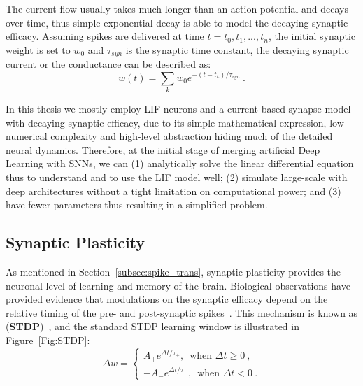 The current flow usually takes much longer than an action potential and decays over time, thus \DIFdelbegin {}\DIFdelend \DIFaddbegin {}\DIFaddend simple exponential decay is able to model the decaying synaptic efficacy.
Assuming spikes are delivered at time $t={t_0, t_1, ..., t_n}$, the initial synaptic weight is set to $w_0$ and $\tau_{syn}$ is the synaptic time constant, the decaying synaptic current or the conductance can be described as:
\begin{equation}
w(t) = \sum_k w_0 e^{-(t-t_k)/\tau_{syn}}~.
\end{equation}

In this thesis we mostly employ LIF neurons and a current-based synapse model with decaying synaptic efficacy, due to its simple mathematical expression, low numerical complexity and high-level abstraction hiding much of the detailed neural dynamics.
Therefore, at the initial stage of merging artificial Deep Learning with \DIFdelbegin {}\DIFdelend \DIFaddbegin {}\DIFaddend SNNs, we can (1) analytically solve the linear differential equation thus to understand and to use the LIF model well; (2) simulate large-scale \DIFdelbegin {}\DIFdelend \DIFaddbegin {}\DIFaddend with deep architectures without a tight limitation on computational power; and (3) have fewer parameters thus resulting in a simplified problem.


\subsection{Synaptic Plasticity}
\label{subsec:STDP}
As mentioned in Section~\ref{subsec:spike_trans}, synaptic plasticity provides the neuronal level of learning and \DIFaddbegin {}\DIFaddend memory of the brain.
Biological observations have provided evidence that modulations on the synaptic efficacy depend on the relative timing of the pre- and post-synaptic spikes~\citep{bi1998synaptic}.
This mechanism is known as \DIFdelbegin {}\DIFdelend \DIFaddbegin {}\DIFaddend (\textbf{STDP})~\citep{song2000competitive}, and the standard STDP learning window is illustrated in Figure~\ref{Fig:STDP}:
\begin{equation}
\Delta w = \left\{
\begin{aligned}
A_+ e^{\Delta t/\tau_+} \textrm{,~~when~} \Delta t \geq 0~, \\
-A_- e^{\Delta t/\tau_-} \textrm{,~~when~} \Delta t < 0~.
\end{aligned}
\right.
\label{equ:stdp}
\end{equation}

